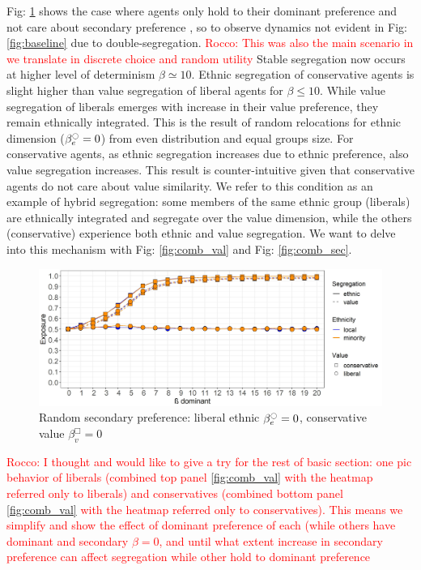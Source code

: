 \documentclass{article}
\newcommand{\rocco}[1]{{\textcolor{red}{Rocco: #1}}} %
\begin{document}
Fig: \ref{fig:sec_0} shows the case where agents only hold to their dominant preference and not care about secondary preference %
, so to observe dynamics not evident in Fig: \ref{fig:baseline} due to double-segregation. \rocco{This was also the main scenario in \textcite{paolillo2018} we translate in discrete choice and random utility}
Stable segregation now occurs at higher level of determinism $\beta \simeq 10$. Ethnic segregation of conservative agents is slight higher than value segregation of liberal agents for $\beta \leq 10$. While value segregation of liberals emerges with increase in their value preference, they remain ethnically integrated. This is the result of random relocations for ethnic dimension ($\beta^{\ocircle}_e = 0$) from even distribution and equal groups size. For conservative agents, as ethnic segregation increases due to ethnic preference, also value segregation increases. This result is counter-intuitive given that conservative agents do not care about value similarity. We refer to this condition as an example of hybrid segregation: some members of the same ethnic group (liberals) are ethnically integrated and segregate over the value dimension, while the others (conservative) experience both ethnic and value segregation. We want to delve into this mechanism with Fig: \ref{fig:comb_val} and Fig: \ref{fig:comb_sec}. 

\begin{figure}[H]
    \centering
    \includegraphics[scale=0.5]{material/figures/sec_0.jpg}
    \caption{Random secondary preference: liberal ethnic $\beta^{\ocircle}_e = 0$, conservative value $\beta^{\Box}_v = 0$}
    \label{fig:sec_0}
\end{figure} %


\rocco{I thought and would like to give a try for the rest of basic section: one pic behavior of liberals  (combined top panel \ref{fig:comb_val} with the heatmap referred only to liberals) and conservatives (combined bottom panel \ref{fig:comb_val} with the heatmap referred only to conservatives). This means we simplify and show the effect of dominant preference of each (while others have dominant and secondary $\beta=0$, and until what extent increase in secondary preference can affect segregation while other hold to dominant preference}
 
\end{document}
